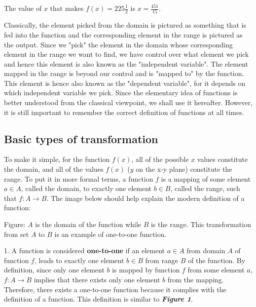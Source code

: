 The value of $x$ that makes $f(x)=225\frac{1}{2}$ is $x=\frac{451}{15}$.



Classically, the element picked from the domain is pictured as something that is fed into
the function and the corresponding element in the range is pictured as the output. Since
we "pick" the element in the domain whose corresponding element in the range we want to
find, we have control over what element we pick and hence this element is also known as
the "independent variable". The element mapped in the range is beyond our control and is
"mapped to" by the function. This element is hence also known as the "dependent variable",
for it depends on which independent variable we pick. Since the elementary idea of
functions is better understood from the classical viewpoint, we shall use it hereafter.
However, it is still important to remember the correct definition of functions at all
times.




\subsection{Basic types of transformation}
\label{sss:basi-cd64}




To make it simple, for the function $f(x)$, all of the possible $x$ values constitute the
domain, and all of the values $f(x)$ ($y$ on the x-y plane) constitute the range. To put
it in more formal terms, a function $f$ is a mapping of some element $a\in A$, called the
domain, to exactly one element $b\in B$, called the range, such that $f:A\to B$. The image
below should help explain the modern definition of a function:






Figure: $A$ is the domain of the function while $B$ is the range. This transformation from
set $A$ to $B$ is an example of one-to-one function.



1.  A function is considered \textbf{one-to-one} if an element $a\in A$ from domain $A$ of
function $f$, leads to exactly one element $b\in B$ from range $B$ of the function. By
definition, since only one element $b$ is mapped by function $f$ from some element $a$,
$f:A\to B$ implies that there exists only one element $b$ from the mapping. Therefore,
there exists a one-to-one function because it complies with the definition of a function.
This definition is similar to \textbf{\textit{Figure 1}}.

